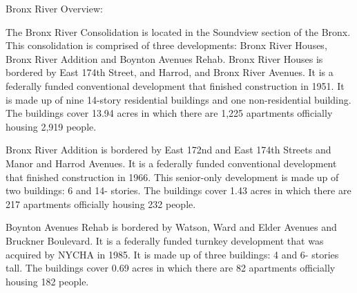 Bronx River Overview:  



The Bronx River Consolidation is located in the Soundview section of the Bronx. This consolidation is comprised of three developments: Bronx River Houses, Bronx River Addition and Boynton Avenues Rehab. Bronx River Houses is bordered by East 174th Street, and Harrod, and Bronx River Avenues. It is a federally funded conventional development that finished construction in 1951. It is made up of nine 14-story residential buildings and one non-residential building. The buildings cover 13.94 acres in which there are 1,225 apartments officially housing 2,919 people.   

 

Bronx River Addition is bordered by East 172nd and East 174th Streets and Manor and Harrod Avenues. It is a federally funded conventional development that finished construction in 1966. This senior-only development is made up of two buildings: 6 and 14- stories. The buildings cover 1.43 acres in which there are 217 apartments officially housing 232 people.   



Boynton Avenues Rehab is bordered by Watson, Ward and Elder Avenues and Bruckner Boulevard. It is a federally funded turnkey development that was acquired by NYCHA in 1985. It is made up of three buildings: 4 and 6- stories tall. The buildings cover 0.69 acres in which there are 82 apartments officially housing 182 people.